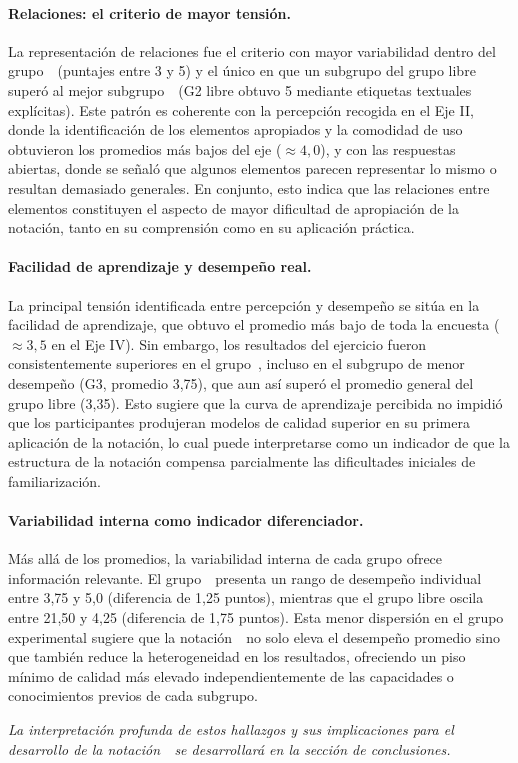 \paragraph{Relaciones: el criterio de mayor tensión.}
La representación de relaciones fue el criterio con mayor variabilidad dentro del grupo~\NDITI~(puntajes entre 3 y 5) y el único en que un subgrupo del grupo libre superó al mejor subgrupo~\NDITI~(G2 libre obtuvo 5 mediante etiquetas textuales explícitas). Este patrón es coherente con la percepción recogida en el Eje II, donde la identificación de los elementos apropiados y la comodidad de uso obtuvieron los promedios más bajos del eje ($\approx 4,0$), y con las respuestas abiertas, donde se señaló que algunos elementos parecen representar lo mismo o resultan demasiado generales. En conjunto, esto indica que las relaciones entre elementos constituyen el aspecto de mayor dificultad de apropiación de la notación, tanto en su comprensión como en su aplicación práctica.

\paragraph{Facilidad de aprendizaje y desempeño real.}
La principal tensión identificada entre percepción y desempeño se sitúa en la facilidad de aprendizaje, que obtuvo el promedio más bajo de toda la encuesta ($\approx 3,5$ en el Eje IV). Sin embargo, los resultados del ejercicio fueron consistentemente superiores en el grupo~\NDITI{}, incluso en el subgrupo de menor desempeño (G3, promedio 3,75), que aun así superó el promedio general del grupo libre (3,35). Esto sugiere que la curva de aprendizaje percibida no impidió que los participantes produjeran modelos de calidad superior en su primera aplicación de la notación, lo cual puede interpretarse como un indicador de que la estructura de la notación compensa parcialmente las dificultades iniciales de familiarización.

\paragraph{Variabilidad interna como indicador diferenciador.}
Más allá de los promedios, la variabilidad interna de cada grupo ofrece información relevante. El grupo~\NDITI~presenta un rango de desempeño individual entre 3,75 y 5,0 (diferencia de 1,25 puntos), mientras que el grupo libre oscila entre 21,50 y 4,25 (diferencia de 1,75 puntos). Esta menor dispersión en el grupo experimental sugiere que la notación~\NDITI~no solo eleva el desempeño promedio sino que también reduce la heterogeneidad en los resultados, ofreciendo un piso mínimo de calidad más elevado independientemente de las capacidades o conocimientos previos de cada subgrupo.

\noindent
\textit{La interpretación profunda de estos hallazgos y sus implicaciones para el desarrollo de la notación~\NDITI~se desarrollará en la sección de conclusiones.}
